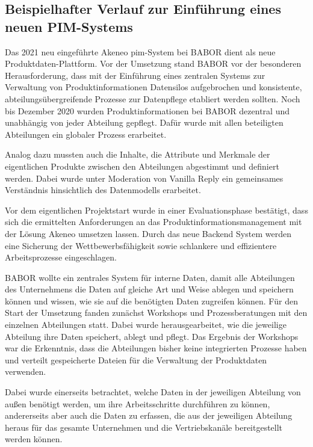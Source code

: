 \subsection{Beispielhafter Verlauf zur Einführung eines neuen PIM-Systems}\label{unterabschnitt_4_3}
Das 2021 neu eingeführte Akeneo \ac{pim}-System bei BABOR dient als neue Produktdaten-Plattform. Vor der Umsetzung stand BABOR vor der besonderen Herausforderung, dass mit der Einführung eines zentralen Systems zur Verwaltung von Produktinformationen Datensilos aufgebrochen und konsistente, abteilungsübergreifende Prozesse zur Datenpflege etabliert werden sollten. Noch bis Dezember 2020 wurden Produktinformationen bei BABOR dezentral und unabhängig von jeder Abteilung gepflegt. Dafür wurde mit allen beteiligten Abteilungen ein globaler Prozess  erarbeitet.

Analog dazu mussten auch die Inhalte, die Attribute und Merkmale der eigentlichen Produkte zwischen den Abteilungen abgestimmt und definiert werden. Dabei wurde unter Moderation von Vanilla Reply ein gemeinsames Verständnis hinsichtlich des Datenmodells erarbeitet.

Vor dem eigentlichen Projektstart wurde in einer Evaluationsphase bestätigt, dass sich die ermittelten Anforderungen an das Produktinformationsmanagement mit der Lösung Akeneo umsetzen lassen. Durch das neue Backend System werden eine Sicherung der Wettbewerbsfähigkeit sowie schlankere und effizientere Arbeitsprozesse eingeschlagen.
\newline

BABOR wollte ein zentrales System für interne Daten, damit alle Abteilungen des Unternehmens die Daten auf gleiche Art und Weise ablegen und speichern können und wissen, wie sie auf die benötigten Daten zugreifen können. Für den Start der Umsetzung fanden zunächst Workshops und Prozessberatungen mit den einzelnen Abteilungen statt. Dabei wurde herausgearbeitet, wie die jeweilige Abteilung ihre Daten speichert, ablegt und pflegt. Das Ergebnis der Workshops war die Erkenntnis, dass die Abteilungen bisher keine integrierten Prozesse haben und verteilt gespeicherte Dateien für die Verwaltung der Produktdaten verwenden.
\newline

Dabei wurde einerseits betrachtet, welche Daten in der jeweiligen Abteilung von außen benötigt werden, um ihre Arbeitsschritte durchführen zu können, andererseits aber auch die Daten zu erfassen, die aus der jeweiligen Abteilung heraus für das gesamte Unternehmen und die Vertriebskanäle bereitgestellt werden können.
\newline

